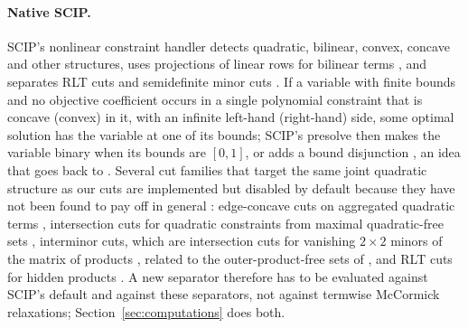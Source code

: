\paragraph{Native SCIP.}
SCIP's nonlinear constraint handler detects quadratic, bilinear, convex,
concave and other structures, uses projections of linear rows for bilinear
terms \citep{MullerSerranoGleixner2020}, and separates RLT cuts
\citep{BestuzhevaGleixnerAchterberg2025} and semidefinite minor cuts
\citep{BestuzhevaEtAl2025}. If a variable with finite bounds and
no objective coefficient occurs in a single polynomial constraint that is
concave (convex) in it, with an infinite left-hand (right-hand) side, some
optimal solution has the variable at one of its bounds; SCIP's presolve then
makes the variable binary when its bounds are $[0,1]$, or adds a bound
disjunction \citep[Section~4.2.7]{SCIP8report}, an idea that goes back to
\citet{HansenEtAl1993}. Several cut families that target the same joint
quadratic structure as our cuts are implemented but disabled by default
because they have not been found to pay off in general
\citep{BestuzhevaEtAl2025,SCIP10}: edge-concave cuts on aggregated quadratic
terms \citep{MisenerFloudas2012}, intersection cuts for quadratic constraints
from maximal quadratic-free sets
\citep{MunozSerrano2022,ChmielaMunozSerrano2023}, interminor cuts, which are
intersection cuts for vanishing $2\times2$ minors of the matrix of products
\citep[Section~4.11]{SCIP8report}, related to the outer-product-free sets of
\citet{BienstockChenMunoz2020}, and RLT cuts for hidden products
\citep{BestuzhevaGleixnerAchterberg2025}. A new separator therefore has to be
evaluated against SCIP's default and against these separators, not against
termwise McCormick relaxations; Section~\ref{sec:computations} does both.

